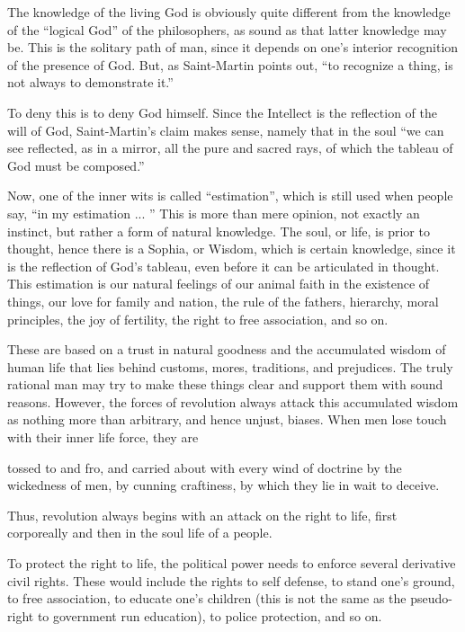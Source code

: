 The knowledge of the living God is obviously quite different from the knowledge of the ``logical God'' of the philosophers, as sound as that latter knowledge may be. This is the solitary path of man, since it depends on one's interior recognition of the presence of God. But, as Saint-Martin points out, ``to recognize a thing, is not always to demonstrate it.''

To deny this is to deny God himself. Since the Intellect is the reflection of the will of God, Saint-Martin's claim makes sense, namely that in the soul ``we can see reflected, as in a mirror, all the pure and sacred rays, of which the tableau of God must be composed.''

Now, one of the inner wits is called ``estimation'', which is still used when people say, ``in my estimation ... '' This is more than mere opinion, not exactly an instinct, but rather a form of natural knowledge. The soul, or life, is prior to thought, hence there is a Sophia, or Wisdom, which is certain knowledge, since it is the reflection of God's tableau, even before it can be articulated in thought. This estimation is our natural feelings of our animal faith in the existence of things, our love for family and nation, the rule of the fathers, hierarchy, moral principles, the joy of fertility, the right to free association, and so on.

These are based on a trust in natural goodness and the accumulated wisdom of human life that lies behind customs, mores, traditions, and prejudices. The truly rational man may try to make these things clear and support them with sound reasons. However, the forces of revolution always attack this accumulated wisdom as nothing more than arbitrary, and hence unjust, biases. When men lose touch with their inner life force, they are

\begin{quotex}
tossed to and fro, and carried about with every wind of doctrine by the wickedness of men, by cunning craftiness, by which they lie in wait to deceive. 
\end{quotex}


Thus, revolution always begins with an attack on the right to life, first corporeally and then in the soul life of a people.

To protect the right to life, the political power needs to enforce several derivative civil rights. These would include the rights to self defense, to stand one's ground, to free association, to educate one's children (this is not the same as the pseudo-right to government run education), to police protection, and so on.




